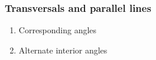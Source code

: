 \documentclass[12pt, twoside]{article}
\begin{document}
\subsubsection*{Transversals and parallel lines}
  \begin{enumerate}
  \item Corresponding angles
  \item Alternate interior angles
  \end{enumerate}
\end{document}
